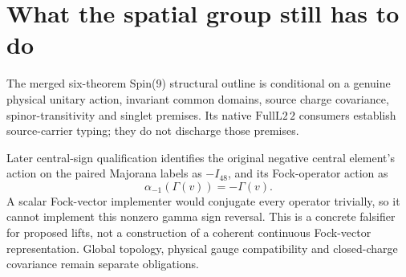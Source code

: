 \section{What the spatial group still has to do}
\label{sec:ed08-spatial}
The merged six-theorem Spin(9) structural outline is conditional
on a genuine physical unitary action, invariant common domains,
source charge covariance, spinor-transitivity and singlet premises.
Its native $\mathrm{FullL2}\,2$ consumers establish source-carrier
typing; they do not discharge those premises.

Later central-sign qualification identifies the original negative
central element's action on the paired Majorana labels as $-I_{48}$,
and its Fock-operator action as
\[
 \alpha_{-1}(\Gamma(v))=-\Gamma(v).
\]
A scalar Fock-vector implementer would conjugate every operator
trivially, so it cannot implement this nonzero gamma sign reversal.
This is a concrete falsifier for proposed lifts, not a construction
of a coherent continuous Fock-vector representation. Global topology,
physical gauge compatibility and closed-charge covariance remain
separate obligations.
